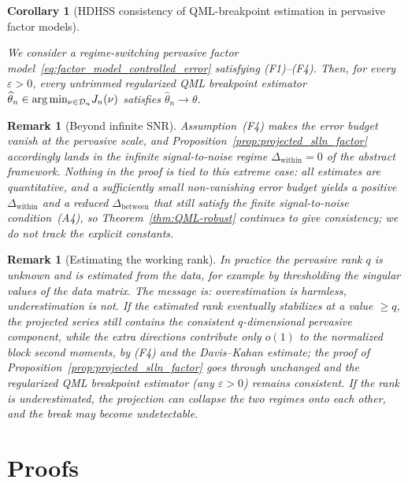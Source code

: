 \documentclass[10pt, letterpaper]{amsart}
\newtheorem{remark}[theorem]{Remark}
\newtheorem{corollary}[theorem]{Corollary}
\def\min{{\rm min}}
\begin{document}
\begin{corollary}[HDHSS consistency of QML-breakpoint estimation in pervasive factor models]\label{thm:qml_consistency_factor}

We consider a regime-switching pervasive factor model~\eqref{eq:factor_model_controlled_error} satisfying \textup{(F1)--(F4)}. Then, for every $\varepsilon>0$, every untrimmed regularized QML breakpoint estimator $\widehat\theta_n\in\arg\min_{\nu\in\mathcal D_n}J_n(\nu)$ satisfies $\widehat\theta_n \to \theta$.

\end{corollary}
\begin{remark}[Beyond infinite SNR]\label{rem:robustness_radius}
Assumption~(F4) makes the error budget vanish at the pervasive scale, and Proposition~\ref{prop:projected_slln_factor} accordingly lands in the infinite signal-to-noise regime $\Delta_{\mathrm{within}}=0$ of the abstract framework. Nothing in the proof is tied to this extreme case: all estimates are quantitative, and a sufficiently small non-vanishing error budget yields a positive $\Delta_{\mathrm{within}}$ and a reduced $\Delta_{\mathrm{between}}$ that still satisfy the finite signal-to-noise condition~\textup{(A4)}, so Theorem~\ref{thm:QML-robust} continues to give consistency; we do not track the explicit constants.
\end{remark}

\begin{remark}[Estimating the working rank]\label{rem:estimating_rank}
In practice the pervasive rank $q$ is unknown and is estimated from the data, for example by thresholding the singular values of the data matrix. The message is: overestimation is harmless, underestimation is not. If the estimated rank eventually stabilizes at a value $\ge q$, the projected series still contains the consistent $q$-dimensional pervasive component, while the extra directions contribute only $o(1)$ to the normalized block second moments, by \textup{(F4)} and the Davis--Kahan estimate; the proof of Proposition~\ref{prop:projected_slln_factor} goes through unchanged and the regularized QML breakpoint estimator (any $\varepsilon>0$) remains consistent. If the rank is underestimated, the projection can collapse the two regimes onto each other, and the break may become undetectable.
\end{remark}

  

\section{Proofs}\label{sec:proofs}
\end{document}
